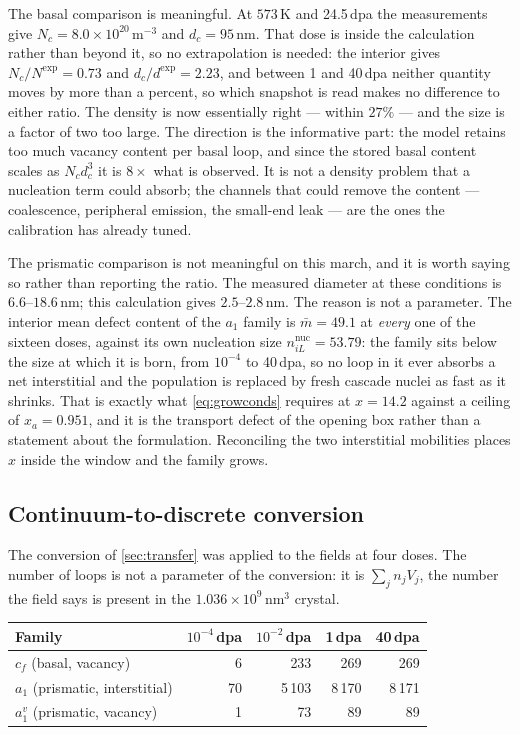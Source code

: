 The basal comparison is meaningful. At $573\,$K and 24.5\,dpa the measurements
give $N_c=8.0\times10^{20}\,\mathrm{m^{-3}}$ and $d_c=95\,$nm. That dose is
inside the calculation rather than beyond it, so no extrapolation is needed: the
interior gives $N_c/N^{\exp}=0.73$ and $d_c/d^{\exp}=2.23$, and between 1 and
40\,dpa neither quantity moves by more than a percent, so which snapshot is read
makes no difference to either ratio. The density is now essentially right ---
within $27\%$ --- and the size is a factor of two too large. The direction is
the informative part: the model retains too much vacancy content per basal loop,
and since the stored basal content scales as $N_c d_c^{3}$ it is $8\times$ what
is observed. It is not a density problem that a nucleation term could absorb;
the channels that could remove the content --- coalescence, peripheral emission,
the small-end leak --- are the ones the calibration has already tuned.

The prismatic comparison is not meaningful on this march, and it is worth saying
so rather than reporting the ratio. The measured \aloop{} diameter at these
conditions is $6.6$--$18.6\,$nm; this calculation gives $2.5$--$2.8\,$nm. The
reason is not a parameter. The interior mean defect content of the $a_1$ family
is $\bar m=49.1$ at \emph{every} one of the sixteen doses, against its own
nucleation size $n^{\mathrm{nuc}}_{iL}=53.79$: the family sits below the size at
which it is born, from $10^{-4}$ to 40\,dpa, so no loop in it ever absorbs a net
interstitial and the population is replaced by fresh cascade nuclei as fast as
it shrinks. That is exactly what \cref{eq:growconds} requires at $x=14.2$
against a ceiling of $x_a=0.951$, and it is the transport defect of the opening
box rather than a statement about the formulation. Reconciling the two
interstitial mobilities places $x$ inside the window and the family grows.

\subsection{Continuum-to-discrete conversion}
\label{sec:results-discrete}

The conversion of \cref{sec:transfer} was applied to the fields at four doses.
The number of loops is not a parameter of the conversion: it is $\sum_j n_j
V_j$, the number the field says is present in the
$1.036\times10^{9}\,\mathrm{nm^{3}}$ crystal.

\begin{center}
\begin{tabular}{@{}lrrrr@{}}
\toprule
Family & $10^{-4}$\,dpa & $10^{-2}$\,dpa & 1\,dpa & 40\,dpa \\
\midrule
$c_f$ (basal, vacancy)          &  6 &   233 &   269 &   269 \\
$a_1$ (prismatic, interstitial) & 70 & 5\,103 & 8\,170 & 8\,171 \\
$a_1^{v}$ (prismatic, vacancy)  &  1 &    73 &    89 &    89 \\
\bottomrule
\end{tabular}
\end{center}

